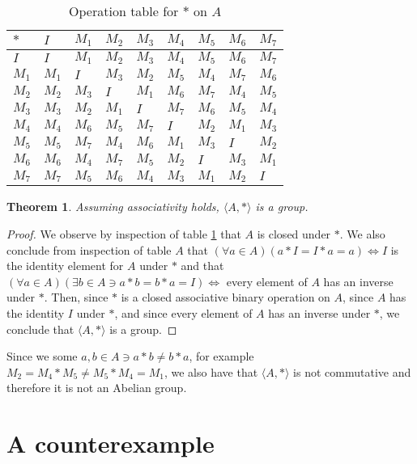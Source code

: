 \documentclass[12pt]{article}
\newtheorem{thm}{Theorem}
\begin{document}
\begin{table}[!ht] 
\begin{tabular}{l|llllllll}
	$*$ & $I$ & $M_1$ & $M_2$ & $M_3$ & $M_4$ & $M_5$ & $M_6$ & $M_7$  \\ \hline
	$I$ & $I$ & $M_1$ & $M_2$ & $M_3$ & $M_4$ & $M_5$ & $M_6$ & $M_7$  \\
	$M_1$ & $M_1$ & $I$ & $M_3$ & $M_2$ & $M_5$ & $M_4$ & $M_7$ & $M_6$  \\
	$M_2$ & $M_2$ & $M_3$ & $I$ & $M_1$ & $M_6$ & $M_7$ & $M_4$ & $M_5$  \\
	$M_3$ & $M_3$ & $M_2$ & $M_1$ & $I$ & $M_7$ & $M_6$ & $M_5$ & $M_4$  \\
	$M_4$ & $M_4$ & $M_6$ & $M_5$ & $M_7$ & $I$ & $M_2$ & $M_1$ & $M_3$  \\
	$M_5$ & $M_5$ & $M_7$ & $M_4$ & $M_6$ & $M_1$ & $M_3$ & $I$ & $M_2$  \\
	$M_6$ & $M_6$ & $M_4$ & $M_7$ & $M_5$ & $M_2$ & $I$ & $M_3$ & $M_1$  \\
	$M_7$ & $M_7$ & $M_5$ & $M_6$ & $M_4$ & $M_3$ & $M_1$ & $M_2$ & $I$  \\
\end{tabular}
\centering
\caption{Operation table for $*$ on $A$}
\label{t2}
\end{table}

\begin{thm}
	Assuming associativity holds, $\langle A, * \rangle$ is a group.
\end{thm}

\begin{proof}
	We observe by inspection of table \ref{t2} that $A$ is closed under $*$.
	We also conclude from inspection of table $A$ that $(\forall a \in A)(a * I = I * a = a) \iff I$ is the identity element for $A$ under $*$ and that $(\forall a \in A)(\exists b \in A \ni a * b = b * a = I) \iff $ every element of $A$ has an inverse under $*$.
	Then, since $*$ is a closed associative binary operation on $A$, since $A$ has the identity $I$ under $*$, and since every element of $A$ has an inverse under $*$, we conclude that $\langle A, * \rangle$ is a group.
\end{proof}

Since we some $a,b \in A \ni a * b \neq b * a$, for example $M_2 = M_4 * M_5 \neq M_5 * M_4 = M_1$, we also have that $\langle A, * \rangle$ is not commutative and therefore it is not an Abelian group.

\section{A counterexample}
\end{document}
